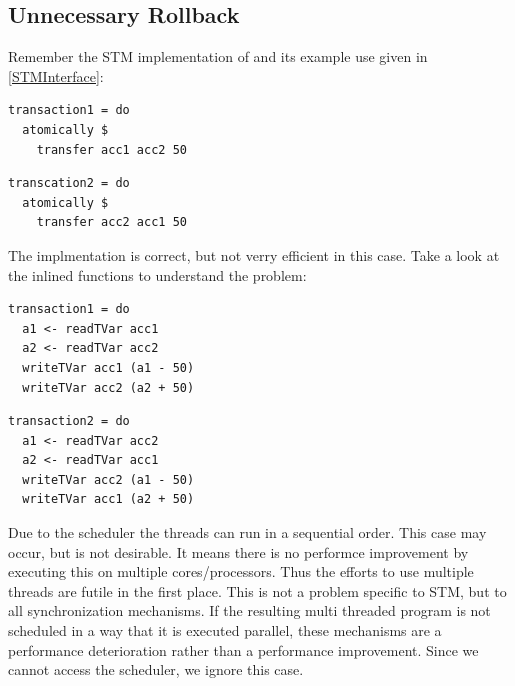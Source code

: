\subsection{Unnecessary Rollback}
\label{Prob:UnRo}
Remember the STM implementation of  and its example use given in \ref{STMInterface}: 
\par\noindent
\begin{minipage}[t]{.45\textwidth}
\begin{lstlisting}[frame=lrtb]
transaction1 = do
  atomically $
    transfer acc1 acc2 50
\end{lstlisting}
\end{minipage}
\hfill
\begin{minipage}[t]{.45\textwidth}
\begin{lstlisting}[frame=lrtb]
transcation2 = do 
  atomically $ 
    transfer acc2 acc1 50
\end{lstlisting}
\end{minipage}
The implmentation is correct, but not verry efficient in this case. Take a look at the inlined functions to understand the 
problem:
\par\noindent
\begin{minipage}[t]{.45\textwidth}
\begin{lstlisting}[frame=lrtb]
transaction1 = do
  a1 <- readTVar acc1
  a2 <- readTVar acc2
  writeTVar acc1 (a1 - 50)
  writeTVar acc2 (a2 + 50)
\end{lstlisting}
\end{minipage}
\hfill
\begin{minipage}[t]{.45\textwidth}
\begin{lstlisting}[frame=lrtb]
transaction2 = do 
  a1 <- readTVar acc2
  a2 <- readTVar acc1
  writeTVar acc2 (a1 - 50)
  writeTVar acc1 (a2 + 50)
\end{lstlisting}
\end{minipage}

Due to the scheduler the threads can run in a sequential order. This case may occur, but is not desirable. It means 
there is no performce improvement by executing this on multiple cores/processors. Thus the efforts to use multiple
threads are futile in the first place. This is not a problem specific to STM, but to all synchronization mechanisms. 
If the resulting multi threaded program is not scheduled in a way that it is executed parallel, these mechanisms are a
performance deterioration rather than a performance improvement. Since we cannot access the scheduler, we ignore 
this case. 

